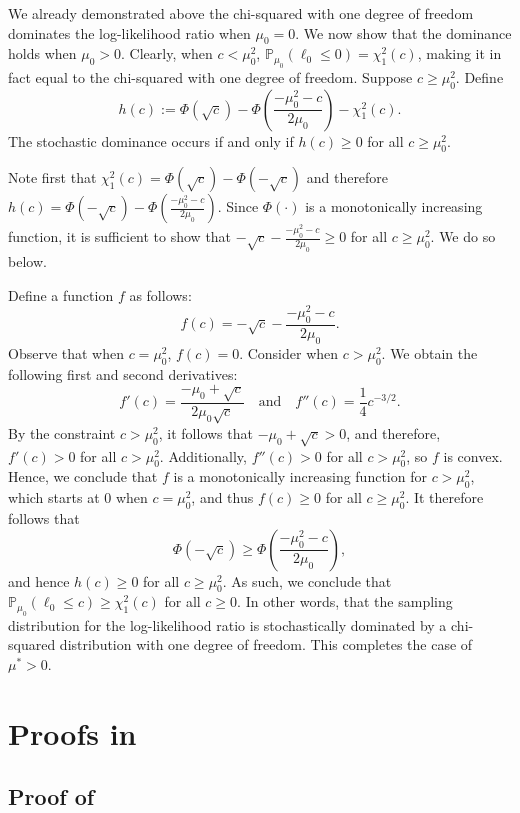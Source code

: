\documentclass[11pt]{article}
\numberwithin{equation}{section}
\numberwithin{figure}{section}
\begin{document}
We already demonstrated above the chi-squared with one degree of freedom dominates the log-likelihood ratio when $\mu_0 = 0$. 
We now show that the dominance holds when $\mu_0 > 0$. Clearly, when $c < \mu_0^2$, $\mathbb{P}_{\mu_0} \left(\ell_0 \leq 0 \right) = \chi^2_1(c)$, making it in fact equal to the chi-squared with one degree of freedom. Suppose $c \geq \mu_0^2$. 
Define 
\[h(c) := \Phi(\sqrt{c}) - \Phi\left( \frac{-\mu_0^2 - c}{2 \mu_0} \right) - \chi^2_1(c).
\]
The stochastic dominance occurs if and only if $h(c) \geq 0$ for all $c \geq \mu_0^2$.

Note first that $\chi^2_1(c) = \Phi(\sqrt{c}) - \Phi(-\sqrt{c})$ and therefore $h(c) = \Phi(-\sqrt{c}) - \Phi\left( \frac{-\mu_0^2 - c}{2 \mu_0} \right)$. Since $\Phi(\cdot)$ is a monotonically increasing function, it is sufficient to show that $-\sqrt{c} - \frac{-\mu_0^2 - c}{2 \mu_0} \geq 0$ for all $c \geq \mu_0^2$. We do so below.

Define a function $f$ as follows:
\[
    f(c) = -\sqrt{c} - \frac{-\mu_0^2 - c}{2 \mu_0}.
\]
Observe that when $c = \mu_0^2$, $f(c) = 0$. 
Consider when $c > \mu_0^2$. 
We obtain the following first and second derivatives:
\[
    f'(c) = \frac{-\mu_0 + \sqrt{c}}{2 \mu_0 \sqrt{c}}
    \quad
    \text{and}
    \quad
    f''(c) = \frac{1}{4}c^{-3/2}. 
\]
By the constraint $c > \mu_0^2$, it follows that $-\mu_0 + \sqrt{c} > 0$, and therefore, $f'(c) > 0$ for all $c > \mu_0^2$. 
Additionally, $f''(c) > 0$ for all $c > \mu_0^2$, so $f$ is convex. 
Hence, we conclude that $f$ is a monotonically increasing function for $c > \mu_0^2$, which starts at $0$ when $c = \mu_0^2$, and thus $f(c) \geq 0$ for all $c \geq \mu_0^2$. 
It therefore follows that 
\[
   \Phi(-\sqrt{c}) \geq \Phi\left(\frac{-\mu_0^2 - c}{2 \mu_0}\right),
\]
and hence $h(c) \geq 0$ for all $c \geq \mu_0^2$. 
As such, we conclude that $\mathbb{P}_{\mu_0}\left(\ell_0 \leq c \right) \geq \chi^2_1(c)$ for all $c \geq 0$.
In other words, that the sampling distribution for the log-likelihood ratio is stochastically dominated by a chi-squared distribution with one degree of freedom. 
This completes the case of $\mu^* > 0$.

\section{Proofs in }
\label{app:sec:rust_burrus_proofs}

\subsection{Proof of }
\end{document}
